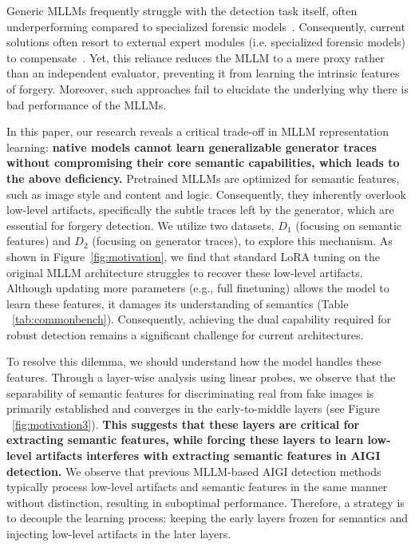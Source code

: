 \documentclass{article}
\theoremstyle{plain}
\theoremstyle{definition}
\theoremstyle{remark}
\begin{document}
Generic MLLMs frequently struggle with the detection task itself, often underperforming compared to specialized forensic models~\citep{jia2024can}. 
Consequently, current solutions often resort to external expert modules (i.e. specialized forensic models) to compensate~\citep{chen2024x2,zhou2025aigi}. 
Yet, this reliance reduces the MLLM to a mere proxy rather than an independent evaluator, preventing it from learning the intrinsic features of forgery. 
Moreover, such approaches fail to elucidate the underlying why there is bad performance of the MLLMs.


In this paper, our research reveals a critical trade-off in MLLM representation learning: \textbf{native models cannot learn generalizable generator traces without compromising their core semantic capabilities, which leads to the above deficiency.}
Pretrained MLLMs are optimized for semantic features, such as image style and content and logic. 
Consequently, they inherently overlook low-level artifacts, specifically the subtle traces left by the generator, which are essential for forgery detection.
We utilize two datasets, $D_1$ (focusing on semantic features) and $D_2$ (focusing on generator traces), to explore this mechanism. 
As shown in Figure~\ref{fig:motivation}, we find that standard LoRA tuning on the original MLLM architecture struggles to recover these low-level artifacts.
Although updating more parameters (e.g., full finetuning) allows the model to learn these features, it damages its understanding of semantics (Table ~\ref{tab:commonbench}).
Consequently, achieving the dual capability required for robust detection remains a significant challenge for current architectures.


To resolve this dilemma, we should understand how the model handles these features. 
Through a layer-wise analysis using linear probes, we observe that the separability of semantic features for discriminating real from fake images is primarily established and converges in the early-to-middle layers (see Figure ~\ref{fig:motivation3}).
\textbf{This suggests that these layers are critical for extracting semantic features, while forcing these layers to learn low-level artifacts interferes with extracting semantic features in AIGI detection. }
We observe that previous MLLM-based AIGI detection methods typically process low-level artifacts and semantic features in the same manner without distinction, resulting in suboptimal performance.
Therefore, a strategy is to decouple the learning process: keeping the early layers frozen for semantics and injecting low-level artifacts in the later layers.
\end{document}
